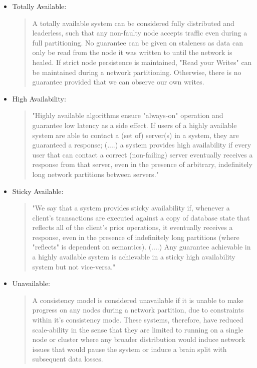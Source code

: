 \documentclass[a4paper,10pt,titlepage]{report}
\begin{document}
\begin{itemize}
   \item Totally Available: 
   \begin{quote}
       A totally available system can be considered fully distributed and leaderless, such that any non-faulty node accepts traffic even during a full partitioning. No guarantee can be given on staleness as data can only be read from the node it was written to until the network is healed. If strict node persistence is maintained, "Read your Writes" can be maintained during a network partitioning. Otherwise, there is no guarantee provided that we can observe our own writes. 
   \end{quote}
   
    \item High Availability:
    \begin{quote}
        "Highly available algorithms ensure "always-on" operation and guarantee low latency as a side effect. If users of a highly available system are able to contact a (set of) server(s) in a system, they are guaranteed a response; (....) a system provides high availability if every user that can contact a correct (non-failing) server eventually receives a response from that server, even in the presence of arbitrary, indefinitely long network partitions between servers." \cite{CAP, HighlyAvailableTransactionsVirtuesandLimitations}
    \end{quote} 
    \item Sticky Available: 
    \begin{quote}
    "We say that a system provides sticky availability if, whenever a client's transactions are executed against a copy of database state that reflects all of the client's prior operations, it eventually receives a response, even in the presence of indefinitely long partitions (where "reflects" is dependent on semantics). (....) Any guarantee achievable in a highly available system is achievable in a sticky high availability system but not vice-versa." \cite{HighlyAvailableTransactionsVirtuesandLimitations}
    \end{quote} 
    \item Unavailable: 
    \begin{quote}
    A consistency model is considered unavailable if it is unable to make progress on any nodes during a network partition, due to constraints within it's consistency mode. These systems, therefore, have reduced scale-ability in the sense that they are limited to running on a single node or cluster where any broader distribution would induce network issues that would pause the system or induce a brain split with subsequent data losses.
\end{quote}
 
\end{itemize}
\end{document}
